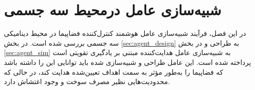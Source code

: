 \chapter{شبیه‌سازی عامل درمحیط سه جسمی}\label{ch:simulation}

%
	

	
		در این فصل، فرآیند شبیه‌سازی عامل هوشمند کنترل‌کننده فضاپیما در محیط دینامیکی سه جسمی بررسی شده است.
		در بخش \ref{sec:agent_design}
		به
		طراحی و 
		در بخش 
		\ref{sec:agent_sim}
	به	شبیه‌سازی عامل هدایت‌کننده مبتنی بر یادگیری تقویتی است
		پرداخته شده است. این عامل طراحی و شبیه‌سازی شده باید توانایی این را داشته باشد 
		 که  فضاپیما را به‌طور مؤثر به سمت اهداف تعیین‌شده هدایت کند، در حالی که محدودیت‌هایی نظیر مصرف سوخت و وجود اغتشاش دارد.
	


